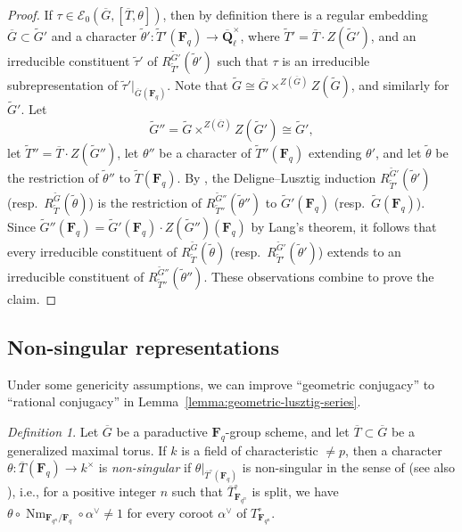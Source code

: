 \documentclass[reqno]{amsart}
\numberwithin{equation}{subsection}
\newcommand{\F}{\mathbf{F}}
\newcommand{\wt}[1]{\widetilde{#1}}
\newcommand{\Q}{\mathbf{Q}}
\newcommand{\ol}[1]{\overline{#1}}
\newcommand{\co}{\colon}
\newcommand\cE{\mathcal{E}}
\DeclareMathOperator{\Nm}{Nm}
\theoremstyle{remark}
\newtheorem{defn}[thm]{Definition}
\numberwithin{equation}{subsection}
\numberwithin{figure}{subsection}
\begin{document}
\begin{proof}
    If $\tau \in \cE_0(\ol G, [\ol T, \theta])$, then by definition there is a regular embedding $\ol G \subset \wt G'$ and a character $\wt\theta'\co \wt T'(\F_q) \to \ol\Q_\ell^\times$, where $\wt T' = \ol T \cdot Z(\wt G')$, and an irreducible constituent $\wt\tau'$ of $R_{\wt T'}^{\wt G'}(\wt\theta')$ such that $\tau$ is an irreducible subrepresentation of $\wt\tau'|_{\ol G(\F_q)}$. Note that $\wt G \cong \ol G \times^{Z(\ol G)} Z(\wt G)$, and similarly for $\wt G'$. Let 
    \[
    \wt G'' = \wt G \times^{Z(\ol G)} Z(\wt G') \cong \wt G',
    \]
    let $\wt T'' = \ol T \cdot Z(\wt G'')$, let $\theta''$ be a character of $\wt T''(\F_q)$ extending $\theta'$, and let $\wt\theta$ be the restriction of $\wt\theta''$ to $\wt T(\F_q)$. By \cite[Remark 2.6.5]{Kal21b}, the Deligne--Lusztig induction $R_{\wt T'}^{\wt G'}(\wt\theta')$ (resp.\ $R_{\wt T}^{\wt G}(\wt\theta)$) is the restriction of $R_{\wt T''}^{\wt G''}(\wt\theta'')$ to $\wt G'(\F_q)$ (resp.\ $\wt G(\F_q)$). Since $\wt G''(\F_q) = \wt G'(\F_q) \cdot Z(\wt G'')(\F_q)$ by Lang's theorem, it follows that every irreducible constituent of $R_{\wt T}^{\wt G}(\wt\theta)$ (resp.\ $R_{\wt T'}^{\wt G'}(\wt\theta')$) extends to an irreducible constituent of $R_{\wt T''}^{\wt G''}(\wt\theta'')$. These observations combine to prove the claim.
\end{proof}



\subsection{Non-singular representations}

Under some genericity assumptions, we can improve ``geometric conjugacy'' to ``rational conjugacy'' in Lemma~\ref{lemma:geometric-lusztig-series}.

\begin{defn}\label{defn:finite-group-non-singular}
    Let $\ol G$ be a paraductive $\F_q$-group scheme, and let $\ol T \subset \ol G$ be a generalized maximal torus. If $k$ is a field of characteristic $\neq p$, then a character $\theta\co \ol T(\F_q) \to k^\times$ is \textit{non-singular} if $\theta|_{\ol T^\circ(\F_q)}$ is non-singular in the sense of \cite[Definition 5.15]{DL76} (see also \cite[Lemma 3.4.14]{Kal19}), i.e., for a positive integer $n$ such that $\ol T^\circ_{\F_{q^n}}$ is split, we have $\theta \circ \Nm_{\F_{q^n}/\F_q} \circ \alpha^\vee \neq 1$ for every coroot $\alpha^\vee$ of $T^\circ_{\F_{q^n}}$.
\end{defn}
\end{document}
